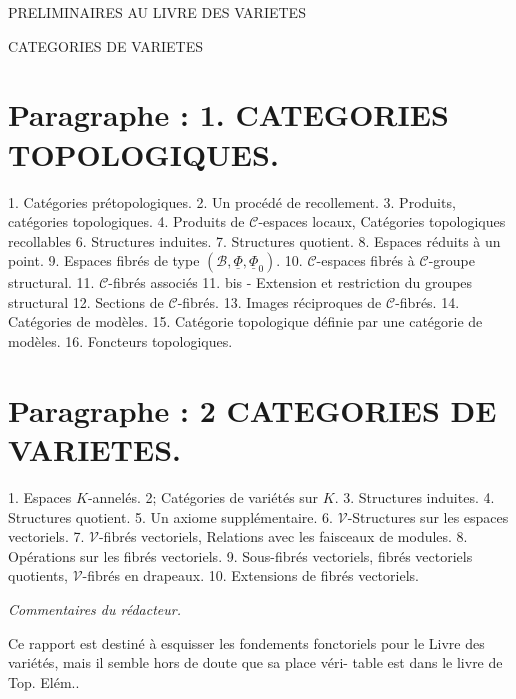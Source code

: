 


PRELIMINAIRES AU LIVRE DES VARIETES

CATEGORIES DE VARIETES

\section*{Paragraphe : 1. CATEGORIES TOPOLOGIQUES.}
1. Catégories prétopologiques.
2. Un procédé de recollement.
3. Produits, catégories topologiques.
4. Produits de $\mathcal{C}$-espaces locaux, Catégories topologiques recollables
6. Structures induites.
7. Structures quotient.
8. Espaces réduits à un point.
9. Espaces fibrés de type $(\mathcal{B}, \underline{\Phi}, \underline{\Phi}_0)$.
10. $\mathcal{C}$-espaces fibrés à $\mathcal{C}$-groupe structural.
11. $\mathcal{C}$-fibrés associés
11. bis - Extension et restriction du groupes structural
12. Sections de $\mathcal{C}$-fibrés.
13. Images réciproques de $\mathcal{C}$-fibrés.
14. Catégories de modèles.
15. Catégorie topologique définie par une catégorie de modèles.
16. Foncteurs topologiques.

\section*{Paragraphe : 2 CATEGORIES DE VARIETES.}
1. Espaces $K$-annelés.
2; Catégories de variétés sur $K$.
3. Structures induites.
4. Structures quotient.
5. Un axiome supplémentaire.
6. $\mathcal{V}$-Structures sur les espaces vectoriels.
7. $\mathcal{V}$-fibrés vectoriels, Relations avec les faisceaux de modules.
8. Opérations sur les fibrés vectoriels.
9. Sous-fibrés vectoriels, fibrés vectoriels quotients, $\mathcal{V}$-fibrés en drapeaux.
10. Extensions de fibrés vectoriels.

\newpage



\emph{Commentaires du rédacteur.}

Ce rapport est destiné à esquisser les fondements fonctoriels pour
le Livre des variétés, mais il semble hors de doute que sa place véri-
table est dans le livre de Top. Elém..

